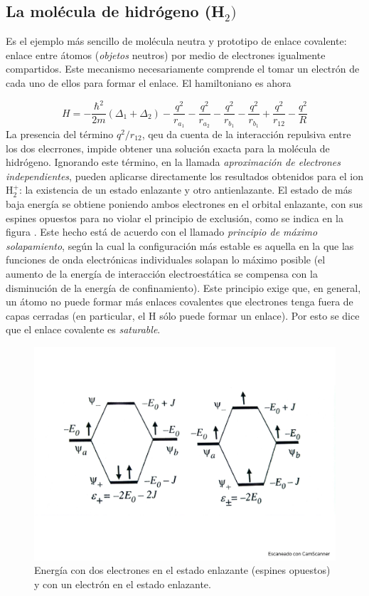 \subsection{La molécula de hidrógeno (H$_2)$} \label{Subsec:03-04-02}

Es el ejemplo más sencillo de molécula neutra y prototipo de enlace covalente: enlace entre átomos (\textit{objetos} neutros) por medio de electrones igualmente compartidos. Este mecanismo necesariamente comprende el tomar un electrón de cada uno de ellos para formar el enlace. El hamiltoniano es ahora

\begin{equation*}
    H = - \frac{\hbar^2}{2m} (\Delta_1 + \Delta_2) - \frac{q^2}{r_{a_1}} - \frac{q^2}{r_{a_2}} - \frac{q^2}{r_{b_1}} - \frac{q^2}{r_{b_1}} + \frac{q^2}{r_{12}} - \frac{q^2}{R}
\end{equation*}
La presencia del término $q^2/r_{12}$, qeu da cuenta de la interacción repulsiva entre los dos elecrrones, impide obtener una solución exacta para la molécula de hidrógeno. Ignorando este término, en la llamada \textit{aproximación de electrones independientes}, pueden aplicarse directamente los resultados obtenidos para el ion H$_2^+$: la existencia de un estado enlazante y otro antienlazante. El estado de más baja energía se obtiene poniendo ambos electrones en el orbital enlazante, con sus espines opuestos para no violar el principio de exclusión, como se indica en la figura . Este hecho está de acuerdo con el llamado \textit{principio de máximo solapamiento}, según la cual la configuración más estable es aquella en la que las funciones de onda electrónicas individuales solapan lo máximo posible (el aumento de la energía de interacción electroestática se compensa con la disminución de la energía de confinamiento). Este principio exige que, en general, un átomo no puede formar más enlaces covalentes que electrones tenga fuera de capas cerradas (en particular, el H sólo puede formar un enlace). Por esto se dice que el enlace covalente es \textit{saturable}. 

\begin{figure}[h!] \centering
    \includegraphics[scale=0.5]{Cuerpo/Ch_03/Fotos libro 5.pdf}
    \caption{Energía con dos electrones en el estado enlazante (espines opuestos) y con un electrón en el estado enlazante.}
    \label{Fig:03-06}
\end{figure}    


